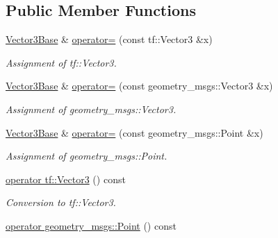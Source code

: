 \subsection*{Public Member Functions}
\begin{DoxyCompactItemize}
\item 
\hyperlink{classow__core_1_1Vector3Base}{Vector3\+Base} \& \hyperlink{classow__core_1_1Vector3Base_a58bd42988587567904a260dda4ac2580}{operator=} (const tf\+::\+Vector3 \&x)\hypertarget{classow__core_1_1Vector3Base_a58bd42988587567904a260dda4ac2580}{}\label{classow__core_1_1Vector3Base_a58bd42988587567904a260dda4ac2580}

\begin{DoxyCompactList}\small\item\em Assignment of tf\+::\+Vector3. \end{DoxyCompactList}\item 
\hyperlink{classow__core_1_1Vector3Base}{Vector3\+Base} \& \hyperlink{classow__core_1_1Vector3Base_ad76032db72fbead4957256fe6c604b8f}{operator=} (const geometry\+\_\+msgs\+::\+Vector3 \&x)\hypertarget{classow__core_1_1Vector3Base_ad76032db72fbead4957256fe6c604b8f}{}\label{classow__core_1_1Vector3Base_ad76032db72fbead4957256fe6c604b8f}

\begin{DoxyCompactList}\small\item\em Assignment of geometry\+\_\+msgs\+::\+Vector3. \end{DoxyCompactList}\item 
\hyperlink{classow__core_1_1Vector3Base}{Vector3\+Base} \& \hyperlink{classow__core_1_1Vector3Base_a6b61059d7d992c86a571ce988ac9c6cd}{operator=} (const geometry\+\_\+msgs\+::\+Point \&x)\hypertarget{classow__core_1_1Vector3Base_a6b61059d7d992c86a571ce988ac9c6cd}{}\label{classow__core_1_1Vector3Base_a6b61059d7d992c86a571ce988ac9c6cd}

\begin{DoxyCompactList}\small\item\em Assignment of geometry\+\_\+msgs\+::\+Point. \end{DoxyCompactList}\item 
\hyperlink{classow__core_1_1Vector3Base_ac450f6a2347fac39bfb0f8f9c59bd078}{operator tf\+::\+Vector3} () const \hypertarget{classow__core_1_1Vector3Base_ac450f6a2347fac39bfb0f8f9c59bd078}{}\label{classow__core_1_1Vector3Base_ac450f6a2347fac39bfb0f8f9c59bd078}

\begin{DoxyCompactList}\small\item\em Conversion to tf\+::\+Vector3. \end{DoxyCompactList}\item 
\hyperlink{classow__core_1_1Vector3Base_a9832df5afb36494b89318de360977aef}{operator geometry\+\_\+msgs\+::\+Point} () const \hypertarget{classow__core_1_1Vector3Base_a9832df5afb36494b89318de360977aef}{}\label{classow__core_1_1Vector3Base_a9832df5afb36494b89318de360977aef}


\end{DoxyCompactItemize}

